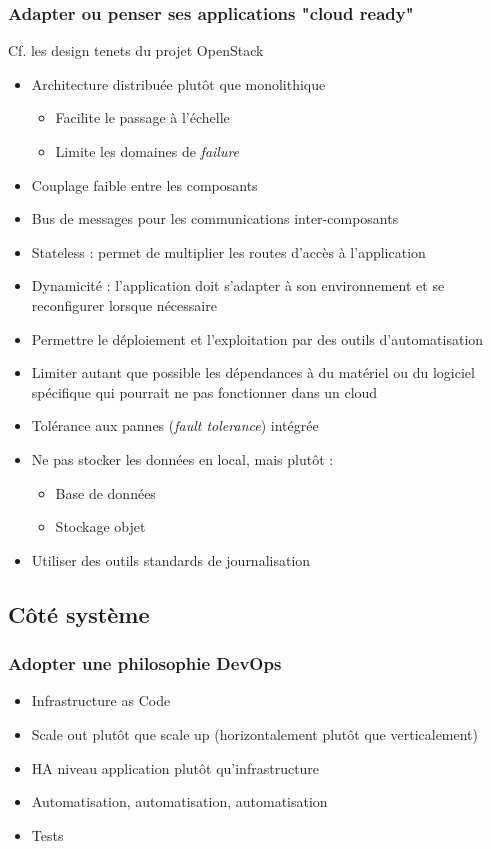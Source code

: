   \begin{frame}[allowframebreaks]
    \frametitle{Adapter ou penser ses applications "cloud ready"}
    Cf. les design tenets du projet OpenStack
    \begin{itemize}
      \item Architecture distribuée plutôt que monolithique
      \begin{itemize}
        \item Facilite le passage à l'échelle
        \item Limite les domaines de \textit{failure}
      \end{itemize}\pause
      \item Couplage faible entre les composants
      \item Bus de messages pour les communications inter-composants\framebreak
      \item Stateless : permet de multiplier les routes d'accès à l'application\pause
      \item Dynamicité : l'application doit s'adapter à son environnement et se reconfigurer lorsque nécessaire\pause
      \item Permettre le déploiement et l'exploitation par des outils d'automatisation\pause
      \item Limiter autant que possible les dépendances à du matériel ou du logiciel spécifique qui pourrait ne pas fonctionner dans un cloud\pause
      \item Tolérance aux pannes (\textit{fault tolerance}) intégrée\pause
      \item Ne pas stocker les données en local, mais plutôt :
      \begin{itemize}
        \item Base de données
        \item Stockage objet
      \end{itemize}\pause
      \item Utiliser des outils standards de journalisation
    \end{itemize}
  \end{frame}

  \subsection{Côté système}

  \begin{frame}
    \frametitle{Adopter une philosophie DevOps}
    \begin{itemize}
      \item Infrastructure as Code
      \item Scale out plutôt que scale up (horizontalement plutôt que verticalement)
      \item HA niveau application plutôt qu'infrastructure
      \item Automatisation, automatisation, automatisation
      \item Tests
    \end{itemize}
  \end{frame}

